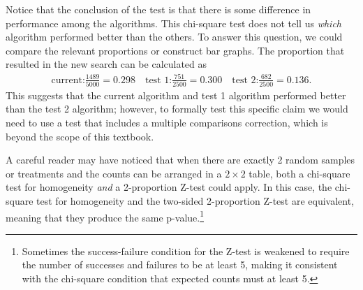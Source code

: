 Notice that the conclusion of the test is that there is some difference in performance among the algorithms.  This chi-square test does not tell us \emph{which} algorithm performed better than the others.  To answer this question, we could compare the relevant proportions or construct bar graphs.   The proportion that resulted in the new search can be calculated as 
\begin{align*}
\text{current:} \frac{1489}{5000} = 0.298 \quad \text{test 1:} \frac{751}{2500} = 0.300 \quad \text{test 2:} \frac{682}{2500} = 0.136.
\end{align*}
This suggests that the current algorithm and test 1 algorithm performed better than the test 2 algorithm; however, to formally test this specific claim we would need to use a test that includes a multiple comparisons correction, which is beyond the scope of this textbook.



A careful reader may have noticed that when there are exactly 2 random samples or treatments and the counts can be arranged in a $2\times 2$ table, both a chi-square test for homogeneity \emph{and} a 2-proportion Z-test could apply.   In this case, the chi-square test for homogeneity and the two-sided 2-proportion Z-test are equivalent, meaning that they produce the same p-value.\footnote{Sometimes the success-failure condition for the Z-test is weakened to require the number of successes and failures to be at least 5, making it consistent with the chi-square condition that expected counts must at least 5.}



\D{\newpage}

